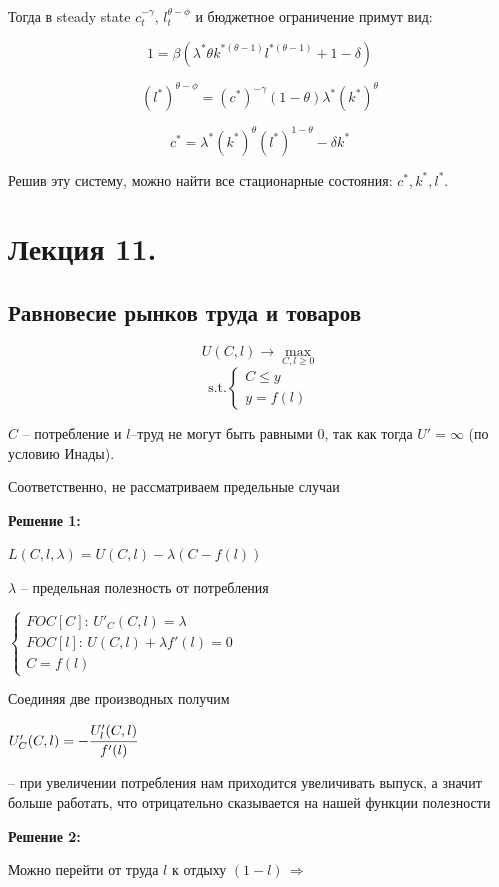 \documentclass[reqno]{article}
\theoremstyle{definition}
\theoremstyle{definition}
\theoremstyle{definition}
\theoremstyle{definition}
\theoremstyle{definition}
\theoremstyle{definition}
\theoremstyle{definition}
\theoremstyle{definition}
\theoremstyle{definition}
\begin{document}
	Тогда в steady state $c_t^{-\gamma}$, $l_t^{\theta - \phi}$ и бюджетное ограничение примут вид:
	
	$$1 = \beta(\lambda^* \theta k^{*(\theta-1)} l^{*(\theta-1)} +1 - \delta)$$
	
	$$(l^*)^{\theta - \phi} = (c^*)^{-\gamma}(1-\theta)\lambda^*(k^*)^\theta$$
	
	$$c^* = \lambda^* (k^*)^\theta (l^*)^{1-\theta}-\delta k^*$$
	
	Решив эту систему, можно найти все стационарные состояния: $ c^*, k^*, l^*$.
		
	\newpage
	
	\section{Лекция 11.}
	
	\subsection{Равновесие рынков труда и товаров}
	$$U(C,l) \rightarrow \max_{C,l \geq 0}$$
	$$
	\text{s.t.} 
	\begin{cases}
		C \leq y \\
		y=f(l)
	\end{cases}
	$$
	
	$C$ -- потребление и $l$--труд не могут быть равными 0, так как тогда $U' = \infty$ (по условию Инады). 
	
	Соответственно, не рассматриваем предельные случаи
	
	\textbf{Решение 1:}
	
	$L(C,l,\lambda)=U(C,l)-\lambda(C-f(l))$
	
	$\lambda$ -- предельная полезность от потребления
	
	$
	\begin{cases}
		FOC[C]: \, U'_C(C,l)=\lambda \\
		FOC[l]: \, U(C,l)+\lambda f'(l) = 0 \\
		C=f(l)
	\end{cases}
	$
	
	Соединяя две производных получим 
	
	$U'_C(C,l)=-\cfrac{U'_l(C,l)}{f'(l)}$
	
	-- при увеличении потребления нам приходится увеличивать выпуск, а значит больше работать, что отрицательно сказывается на нашей функции полезности
	
	\textbf{Решение 2:}
	
	Можно перейти от труда $l$ к отдыху $(1-l) \, \Rightarrow$
	
\end{document}
